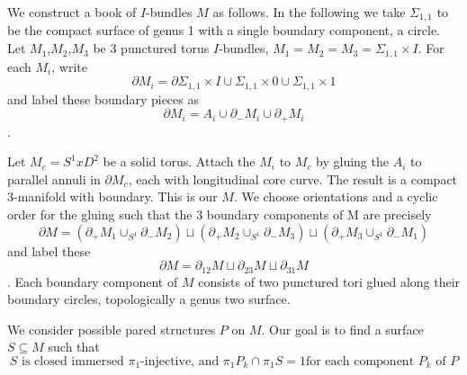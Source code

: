 \documentclass[12pt]{amsart}
\theoremstyle{definition}
\theoremstyle{remark}
\newcommand{\x}{\times}
\newcommand{\bd}{\partial}
\newcommand{\Si}{\Sigma}
\newcommand{\cin}{\subseteq}
\begin{document}
We construct a book of $I$-bundles $M$ as follows. In the following we take
$\Si_{1,1}$ to be the compact surface of genus 1 with a single boundary
component, a circle. Let $M_1$,$M_2$,$M_3$ be 3 punctured torus $I$-bundles,
$M_1=M_2=M_3=\Si_{1,1}\x I$. For each $M_i$, write \[ \bd M_i = \bd \Si_{1,1}\x
I \cup \Si_{1,1}\x0 \cup \Si_{1,1} \x 1 \] and label these boundary pieces as
\[ \bd M_i = A_i \cup \bd_- M_i \cup \bd_+M_i \].

Let $M_c = S^1xD^2$ be a solid torus. Attach the $M_i$ to $M_c$ by gluing the
$A_i$ to parallel annuli in $\bd M_c$, each with longitudinal core curve. The
result is a compact 3-manifold with boundary. This is our $M$. We choose
orientations and a cyclic order for the gluing such that the 3 boundary
components of M are precisely
\[
\bd M = (\bd_+M_1 \cup_{S^1} \bd_-M_2) \sqcup (\bd_+M_2 \cup_{S^1} \bd_-M_3)
\sqcup (\bd_+M_3 \cup_{S^1} \bd_-M_1)
\]
and label these
\[
\bd M=\bd_{12}M \sqcup \bd_{23}M \sqcup \bd_{31}M
\].
Each boundary
component of $M$ consists of two punctured tori glued along their boundary
circles, topologically a genus two surface.

We consider possible pared structures $P$ on $M$. Our goal is to find
a surface $S \cin M$ such that
\begin{equation}\label{E:qf}
S \text{ is closed immersed $\pi_1$-injective, and  $\pi_1P_k \cap \pi_1S
= 1$
for each component $P_k$ of $P$} \tag{\textasteriskcentered}
\end{equation}

%
\end{document}
